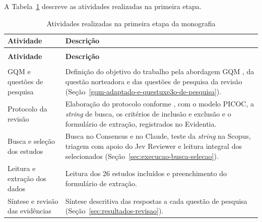 A Tabela~\ref{tab:atividades-primeira-etapa}
descreve as atividades realizadas na primeira etapa.

\begingroup
\footnotesize
\setlength{\tabcolsep}{4pt}
\renewcommand{\arraystretch}{1.15}
\begin{longtable}{|>{\raggedright\arraybackslash}p{4.2cm}|>{\raggedright\arraybackslash}p{10.8cm}|}
	\caption{Atividades realizadas na primeira etapa da monografia}\label{tab:atividades-primeira-etapa} \\
	\hline
	\textbf{Atividade}               & \textbf{Descrição}                                                \\
	\hline
	\endfirsthead
	\multicolumn{2}{l}{\footnotesize\textit{Tabela~\ref{tab:atividades-primeira-etapa} (continuação)}}   \\
	\hline
	\textbf{Atividade}               & \textbf{Descrição}                                                \\
	\hline
	\endhead
	\hline
	\multicolumn{2}{r}{\footnotesize\textit{continua na próxima página}}                                 \\
	\endfoot
	\hline
	\endlastfoot
	GQM e questões de pesquisa       & Definição do objetivo do trabalho pela abordagem
	GQM \cite{basili1994}, da questão norteadora e das questões de pesquisa da
	revisão (Seção~\ref{gqm-adaptado-e-questuxe3o-de-pesquisa}).                                         \\
	\hline
	Protocolo da revisão             & Elaboração do protocolo conforme
	\citeonline{kitchenham2007}, com o modelo PICOC, a \textit{string} de busca,
	os critérios de inclusão e exclusão e o formulário de extração, registrados
	no Evidentia.                                                                                        \\
	\hline
	Busca e seleção dos estudos      & Busca no Consensus e no Claude, teste da
	\textit{string} na Scopus, triagem com apoio do Jev Reviewer e leitura
	integral dos selecionados (Seção~\ref{sec:execucao-busca-selecao}).                                  \\
	\hline
	Leitura e extração dos dados     & Leitura dos 26 estudos incluídos e
	preenchimento do formulário de extração.                                                             \\
	\hline
	Síntese e revisão das evidências & Síntese descritiva das respostas a cada
	questão de pesquisa (Seção~\ref{sec:resultados-revisao}).                                            \\

\end{longtable}
